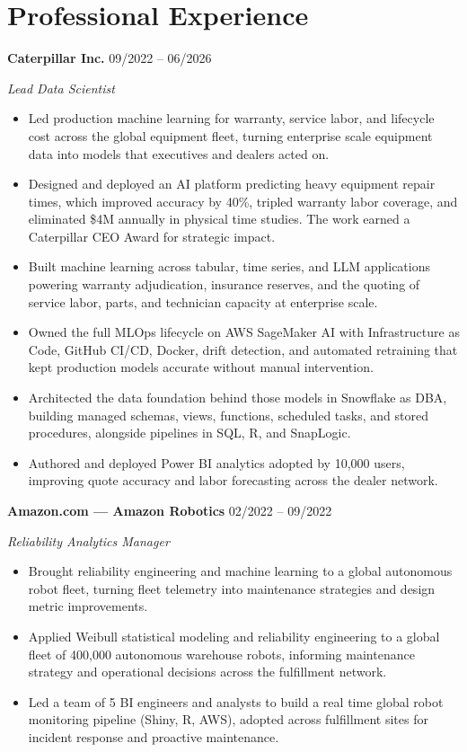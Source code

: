 \documentclass[10pt]{article}
\newcommand{\companyentry}[3]{%
  \smallskip\textbf{#1}\hspace{0.4em}{\color{slate}\small #2}\hfill{\color{slate}\small #3}\par}
\newcommand{\role}[1]{\textit{#1}\par\vspace{1pt}}
\begin{document}
\section{Professional Experience}

\companyentry{Caterpillar Inc. }{Peoria, IL}{09/2022 -- 06/2026}
\role{Lead Data Scientist}

    \begin{itemize}
        \item Led production machine learning for warranty, service labor, and lifecycle cost across the global equipment fleet, turning enterprise scale equipment data into models that executives and dealers acted on.
        \item Designed and deployed an AI platform predicting heavy equipment repair times, which improved accuracy by 40\%, tripled warranty labor coverage, and eliminated \$4M annually in physical time studies. The work earned a Caterpillar CEO Award for strategic impact.
        \item Built machine learning across tabular, time series, and LLM applications powering warranty adjudication, insurance reserves, and the quoting of service labor, parts, and technician capacity at enterprise scale.
        \item Owned the full MLOps lifecycle on AWS SageMaker AI with Infrastructure as Code, GitHub CI/CD, Docker, drift detection, and automated retraining that kept production models accurate without manual intervention.
        \item Architected the data foundation behind those models in Snowflake as DBA, building managed schemas, views, functions, scheduled tasks, and stored procedures, alongside pipelines in SQL, R, and SnapLogic.
        \item Authored and deployed Power BI analytics adopted by 10,000 users, improving quote accuracy and labor forecasting across the dealer network.
    \end{itemize}

\companyentry{Amazon.com --- Amazon Robotics }{Tempe, AZ}{02/2022 -- 09/2022}
\role{Reliability Analytics Manager}

\begin{itemize}
    \item Brought reliability engineering and machine learning to a global autonomous robot fleet, turning fleet telemetry into maintenance strategies and design metric improvements.
    \item Applied Weibull statistical modeling and reliability engineering to a global fleet of 400,000 autonomous warehouse robots, informing maintenance strategy and operational decisions across the fulfillment network.
    \item Led a team of 5 BI engineers and analysts to build a real time global robot monitoring pipeline (Shiny, R, AWS), adopted across fulfillment sites for incident response and proactive maintenance.
\end{itemize}
\end{document}
